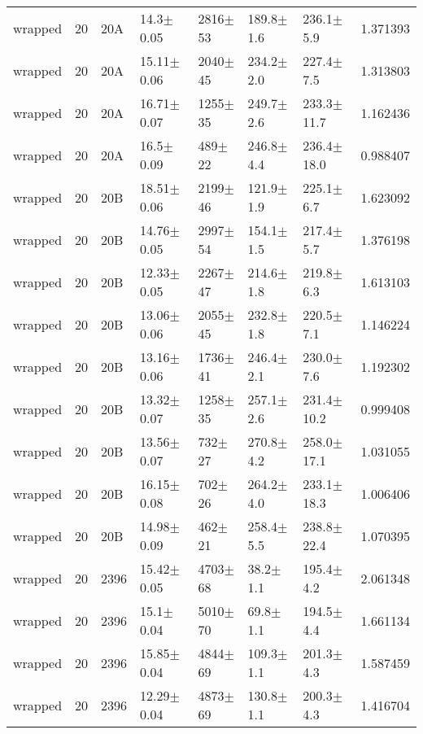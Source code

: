 \begin{tabular}{lrlllllr}
      wrapped &      20 &     20A &    14.3$\pm$0.05 &  2816$\pm$53 &   189.8$\pm$1.6 &   236.1$\pm$5.9 &    1.371393 \\
      wrapped &      20 &     20A &   15.11$\pm$0.06 &  2040$\pm$45 &   234.2$\pm$2.0 &   227.4$\pm$7.5 &    1.313803 \\
      wrapped &      20 &     20A &   16.71$\pm$0.07 &  1255$\pm$35 &   249.7$\pm$2.6 &  233.3$\pm$11.7 &    1.162436 \\
      wrapped &      20 &     20A &    16.5$\pm$0.09 &   489$\pm$22 &   246.8$\pm$4.4 &  236.4$\pm$18.0 &    0.988407 \\
      wrapped &      20 &     20B &   18.51$\pm$0.06 &  2199$\pm$46 &   121.9$\pm$1.9 &   225.1$\pm$6.7 &    1.623092 \\
      wrapped &      20 &     20B &   14.76$\pm$0.05 &  2997$\pm$54 &   154.1$\pm$1.5 &   217.4$\pm$5.7 &    1.376198 \\
      wrapped &      20 &     20B &   12.33$\pm$0.05 &  2267$\pm$47 &   214.6$\pm$1.8 &   219.8$\pm$6.3 &    1.613103 \\
      wrapped &      20 &     20B &   13.06$\pm$0.06 &  2055$\pm$45 &   232.8$\pm$1.8 &   220.5$\pm$7.1 &    1.146224 \\
      wrapped &      20 &     20B &   13.16$\pm$0.06 &  1736$\pm$41 &   246.4$\pm$2.1 &   230.0$\pm$7.6 &    1.192302 \\
      wrapped &      20 &     20B &   13.32$\pm$0.07 &  1258$\pm$35 &   257.1$\pm$2.6 &  231.4$\pm$10.2 &    0.999408 \\
      wrapped &      20 &     20B &   13.56$\pm$0.07 &   732$\pm$27 &   270.8$\pm$4.2 &  258.0$\pm$17.1 &    1.031055 \\
      wrapped &      20 &     20B &   16.15$\pm$0.08 &   702$\pm$26 &   264.2$\pm$4.0 &  233.1$\pm$18.3 &    1.006406 \\
      wrapped &      20 &     20B &   14.98$\pm$0.09 &   462$\pm$21 &   258.4$\pm$5.5 &  238.8$\pm$22.4 &    1.070395 \\
      wrapped &      20 &    2396 &   15.42$\pm$0.05 &  4703$\pm$68 &    38.2$\pm$1.1 &   195.4$\pm$4.2 &    2.061348 \\
      wrapped &      20 &    2396 &    15.1$\pm$0.04 &  5010$\pm$70 &    69.8$\pm$1.1 &   194.5$\pm$4.4 &    1.661134 \\
      wrapped &      20 &    2396 &   15.85$\pm$0.04 &  4844$\pm$69 &   109.3$\pm$1.1 &   201.3$\pm$4.3 &    1.587459 \\
      wrapped &      20 &    2396 &   12.29$\pm$0.04 &  4873$\pm$69 &   130.8$\pm$1.1 &   200.3$\pm$4.3 &    1.416704 \\

\end{tabular}
